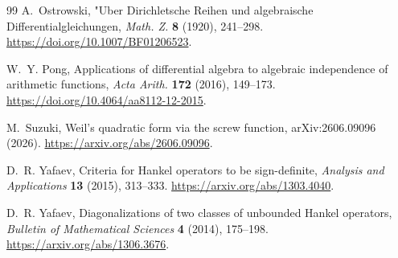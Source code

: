 \documentclass[11pt]{article}
\theoremstyle{definition}
\theoremstyle{remark}
\begin{document}
\begin{thebibliography}{99}
A.~Ostrowski,
\newblock "Uber Dirichletsche Reihen und algebraische Differentialgleichungen,
\newblock \emph{Math. Z.} \textbf{8} (1920), 241--298.
\newblock \url{https://doi.org/10.1007/BF01206523}.

W.~Y. Pong,
\newblock Applications of differential algebra to algebraic independence of arithmetic
functions,
\newblock \emph{Acta Arith.} \textbf{172} (2016), 149--173.
\newblock \url{https://doi.org/10.4064/aa8112-12-2015}.

M.~Suzuki,
\newblock Weil's quadratic form via the screw function,
\newblock arXiv:2606.09096 (2026).
\newblock \url{https://arxiv.org/abs/2606.09096}.

D.~R. Yafaev,
\newblock Criteria for Hankel operators to be sign-definite,
\newblock \emph{Analysis and Applications} \textbf{13} (2015), 313--333.
\newblock \url{https://arxiv.org/abs/1303.4040}.

D.~R. Yafaev,
\newblock Diagonalizations of two classes of unbounded Hankel operators,
\newblock \emph{Bulletin of Mathematical Sciences} \textbf{4} (2014), 175--198.
\newblock \url{https://arxiv.org/abs/1306.3676}.

\end{thebibliography}
\end{document}
